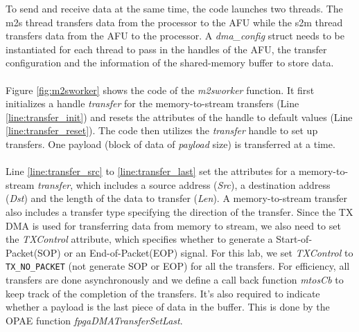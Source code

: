 \documentclass[epsfig,10pt,fullpage]{article}
\begin{document}
\noindent
To send and receive data at the same time, the code launches two threads. The m2s thread transfers data from the processor to the AFU while the s2m thread transfers data from the AFU to the processor. A {\it dma\_config} struct needs to be instantiated for each thread to pass in the handles of the AFU, the transfer configuration and the information of the shared-memory buffer to store data.\\
~\\
Figure \ref{fig:m2sworker} shows the code of the \emph{m2sworker} function. It first initializes a handle \emph{transfer} for the memory-to-stream transfers (Line \ref{line:transfer_init}) and resets the attributes of the handle to default values (Line \ref{line:transfer_reset}). The code then utilizes the \emph{transfer} handle to set up transfers. One payload (block of data of \emph{payload} size) is transferred at a time. \\
\\
Line \ref{line:transfer_src} to \ref{line:transfer_last} set the attributes for a memory-to-stream {\it transfer}, which includes a source address ({\it Src}), a destination address ({\it Dst}) and the length of the data to transfer ({\it Len}). A memory-to-stream transfer also includes a transfer type specifying the direction of the transfer. Since the TX DMA is used for transferring data from memory to stream, we also need to set the {\it TXControl} attribute, which specifies whether to generate a Start-of-Packet(SOP) or an End-of-Packet(EOP) signal. For this lab, we set {\it TXControl} to \verb|TX_NO_PACKET| (not generate SOP or EOP) for all the transfers. For efficiency, all transfers are done asynchronously and we define a call back function {\it mtosCb} to keep track of the completion of the transfers. It's also required to indicate whether a payload is the last piece of data in the buffer. This is done by the OPAE function {\it fpgaDMATransferSetLast}. \\
\end{document}

